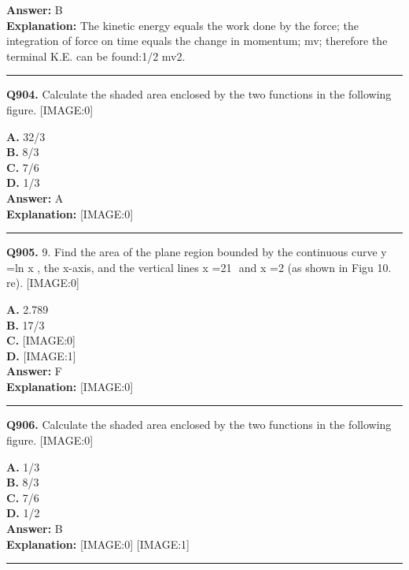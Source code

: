 \documentclass[12pt]{article}
\begin{document}
\textbf{Answer:} B \\
\textbf{Explanation:} The kinetic energy equals the work done by the force; the integration of force on time equals the change in momentum; mv; therefore the terminal K.E. can be found:1/2 mv2.

\hrule
\vspace{1em}


\noindent
\textbf{Q904.} Calculate the shaded area enclosed by the two functions in the following figure.
[IMAGE:0]



\textbf{A.} 32/3 \\
\textbf{B.} 8/3 \\
\textbf{C.} 7/6 \\
\textbf{D.} 1/3 \\

\textbf{Answer:} A \\
\textbf{Explanation:} [IMAGE:0]

\hrule
\vspace{1em}


\noindent
\textbf{Q905.} 9.
Find the area of the plane region bounded by the continuous curve
y
=ln
x
, the x-axis, and the vertical lines
x
=21
​
and
x
=2 (as shown in Figu
10.
re).
[IMAGE:0]



\textbf{A.} 2.789 \\
\textbf{B.} 17/3 \\
\textbf{C.} [IMAGE:0] \\
\textbf{D.} [IMAGE:1] \\

\textbf{Answer:} F \\
\textbf{Explanation:} [IMAGE:0]

\hrule
\vspace{1em}


\noindent
\textbf{Q906.} Calculate the shaded area enclosed by the two functions in the following figure.
[IMAGE:0]



\textbf{A.} 1/3 \\
\textbf{B.} 8/3 \\
\textbf{C.} 7/6 \\
\textbf{D.} 1/2 \\

\textbf{Answer:} B \\
\textbf{Explanation:} [IMAGE:0]
[IMAGE:1]

\hrule
\vspace{1em}
\end{document}
